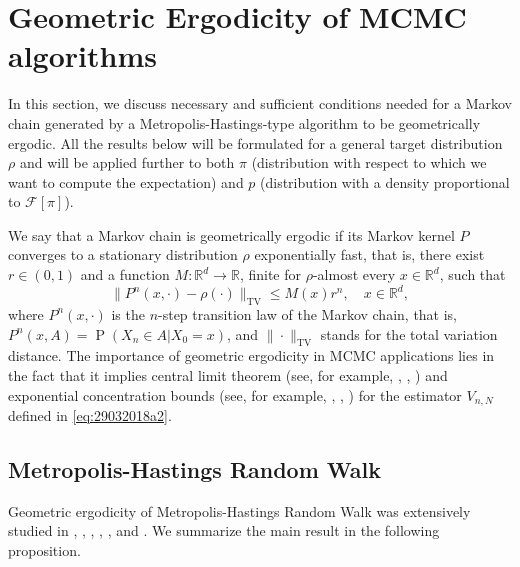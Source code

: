 \documentclass[preprint, 3p, authoryear]{elsarticle}
\renewcommand{\P}{\operatorname{P}}
\newcommand{\R}{\mathbb R}
\newcommand{\tcg}[1]{\textcolor{JungleGreen}{#1}}
\theoremstyle{definition}
\begin{document}
\section{Geometric Ergodicity of MCMC algorithms}\label{sec:ergodicity} %
In this section, we discuss necessary and sufficient conditions needed for a Markov chain 
generated by a Metropolis-Hastings-type algorithm to be geometrically ergodic. All the results 
below will be formulated for a general target distribution $\rho$ and will be applied further to both 
$\pi$ (distribution with respect to which we want to compute the expectation) and $p$ (distribution with 
a density proportional to $\mathcal{F}[\pi]$).
\par
We say that a Markov chain is geometrically ergodic if its Markov kernel $P$ converges to a stationary distribution $\rho$ exponentially fast,
that is, there exist $r \in(0,1)$ and a function $M: \R^d\to\R$, finite for $\rho$-almost every $x\in\R^d$, such that
\[
	\bigl\| P^n(x,\cdot) - \rho(\cdot) \bigr\|_{\mathrm{TV}} \leq M(x) r^n,
	\quad x\in\R^d,
\]
where $P^n(x,\cdot)$ is the $n$-step transition law of the Markov chain, that is, $P^n(x,A) = \P (X_n\in A \vert X_0=x)$,
and $\|\cdot\|_{\mathrm{TV}}$ stands for the total variation distance.
The importance of geometric ergodicity in MCMC applications lies in the fact that
it implies central limit theorem (see, for example, \cite{ibragimovlinnik1971}, \cite{tierney1994}, \cite{jones2004}) and 
exponential concentration bounds (see, for example, \cite{dedecker2015}, \cite{wintenberger2017}, \cite{havert2019})
for the estimator $V_{n,N}$ defined in \eqref{eq:29032018a2}. 

\subsection{Metropolis-Hastings Random Walk}
Geometric ergodicity of Metropolis-Hastings Random Walk was extensively studied in 
\citet{meyntweedie1993}, \citet{tierney1994}, \citet{robertstweedie1996}, \citet{mengersetweedie1996}, \cite{jarnerhansen2000}, and \cite{jarnertweedie2003}. 
We summarize the main result in the following proposition.
\end{document}
